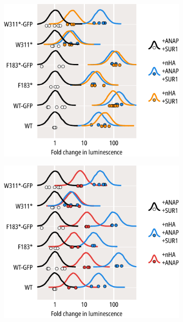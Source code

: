 \begin{figure}[h]
	\centering
	\begin{subfigure}[t]{0.45\textwidth}
		\caption{}\label{ch3fig:surface_expression_1}
		\centering
		\includegraphics[width=\textwidth]{surface_expression_1.pdf}
	\end{subfigure}
	\hfill
	\begin{subfigure}[t]{0.45\textwidth}
		\caption{}\label{ch3fig:surface_expression_2}
		\centering
		\includegraphics[width=\textwidth]{surface_expression_2.pdf}

\end{subfigure}
\end{figure}

